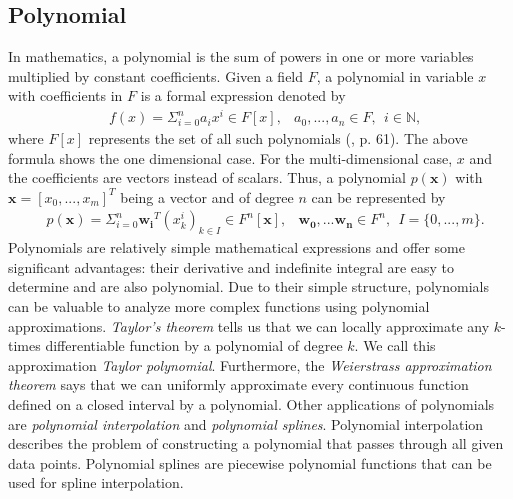 


\subsection{Polynomial}
In mathematics, a polynomial is the sum of powers in one or more variables multiplied by constant coefficients. Given a field $F$, a polynomial in variable $x$ with coefficients in $F$ is a formal expression denoted by
\begin{align*}
  &f(x) = \Sigma_{i=0}^{n} a_i x^i \in F[x], &a_0, ..., a_n \in F, \ \ i \in \mathbb{N},
\end{align*}
where $F[x]$ represents the set of all such polynomials (\citet{fischer2014}, p. 61). The above formula shows the one dimensional case. For the multi-dimensional case, $x$ and the coefficients are vectors instead of scalars. Thus, a polynomial $p(\mathbf{x})$ with $\mathbf{x} = [x_0, ..., x_m]^T$ being a vector and of degree $n$ can be represented by
\begin{align*}
  &p(\mathbf{x}) = \Sigma_{i=0}^{n} \mathbf{w_i}^T (x_k^i)_{k \in I} \in F^n[\mathbf{x}], &\mathbf{w_0}, ... \mathbf{w_n} \in F^n, \ \ I = \{0, ..., m\}.
\end{align*}
Polynomials are relatively simple mathematical expressions and offer some significant advantages: their derivative and indefinite integral are easy to determine and are also polynomial. Due to their simple structure, polynomials can be valuable to analyze more complex functions using polynomial approximations. \textit{Taylor's theorem} tells us that we can locally approximate any $k$-times differentiable function by a polynomial of degree $k$. We call this approximation \textit{Taylor polynomial}. Furthermore, the \textit{Weierstrass approximation theorem} says that we can uniformly approximate every continuous function defined on a closed interval by a polynomial. Other applications of polynomials are \textit{polynomial interpolation} and \textit{polynomial splines}. Polynomial interpolation describes the problem of constructing a polynomial that passes through all given data points. Polynomial splines are piecewise polynomial functions that can be used for spline interpolation.


